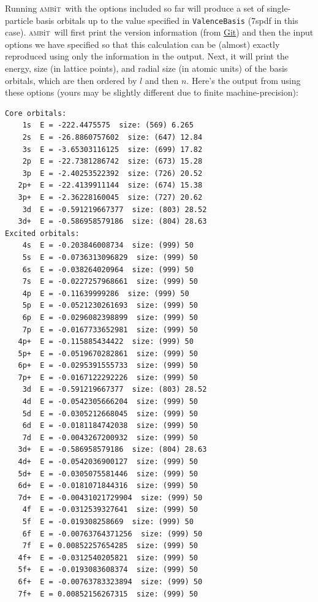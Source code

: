 \documentclass{report}
\newcommand{\ambit}{\textsc{amb}{\footnotesize i}\textsc{t}}
\begin{document}
Running \ambit\  with the options included so far will produce a set of single-particle basis orbitals up
to the value specified in \texttt{ValenceBasis} (7spdf in this case). \ambit\  will first print the 
version information (from \href{https://git-scm.com/}{Git}) and then the input options we have specified
so that this calculation can be (almost) exactly reproduced using only the information in the output.
Next, it will print the energy, size (in lattice points), and radial size (in atomic units) of the basis
orbitals, which are then ordered by $l$ and then $n$. Here's the output from using these options (yours
may be slightly different due to finite machine-precision):

\begin{verbatim}
Core orbitals: 
    1s  E = -222.4475575  size: (569) 6.265
    2s  E = -26.8860757602  size: (647) 12.84
    3s  E = -3.65303116125  size: (699) 17.82
    2p  E = -22.7381286742  size: (673) 15.28
    3p  E = -2.40253522392  size: (726) 20.52
   2p+  E = -22.4139911144  size: (674) 15.38
   3p+  E = -2.36228160045  size: (727) 20.62
    3d  E = -0.591219667377  size: (803) 28.52
   3d+  E = -0.586958579186  size: (804) 28.63
Excited orbitals: 
    4s  E = -0.203846008734  size: (999) 50
    5s  E = -0.0736313096829  size: (999) 50
    6s  E = -0.038264020964  size: (999) 50
    7s  E = -0.0227257968661  size: (999) 50
    4p  E = -0.11639999286  size: (999) 50
    5p  E = -0.0521230261693  size: (999) 50
    6p  E = -0.0296082398899  size: (999) 50
    7p  E = -0.0167733652981  size: (999) 50
   4p+  E = -0.115885434422  size: (999) 50
   5p+  E = -0.0519670282861  size: (999) 50
   6p+  E = -0.0295391555733  size: (999) 50
   7p+  E = -0.0167122292226  size: (999) 50
    3d  E = -0.591219667377  size: (803) 28.52
    4d  E = -0.0542305666204  size: (999) 50
    5d  E = -0.0305212668045  size: (999) 50
    6d  E = -0.0181184742038  size: (999) 50
    7d  E = -0.0043267200932  size: (999) 50
   3d+  E = -0.586958579186  size: (804) 28.63
   4d+  E = -0.0542036900127  size: (999) 50
   5d+  E = -0.0305075581446  size: (999) 50
   6d+  E = -0.0181071844316  size: (999) 50
   7d+  E = -0.00431021729904  size: (999) 50
    4f  E = -0.0312539327641  size: (999) 50
    5f  E = -0.019308258669  size: (999) 50
    6f  E = -0.00763764371256  size: (999) 50
    7f  E = 0.00852257654285  size: (999) 50
   4f+  E = -0.0312540205821  size: (999) 50
   5f+  E = -0.0193083608374  size: (999) 50
   6f+  E = -0.00763783323894  size: (999) 50
   7f+  E = 0.00852156267315  size: (999) 50
\end{verbatim}
\end{document}
